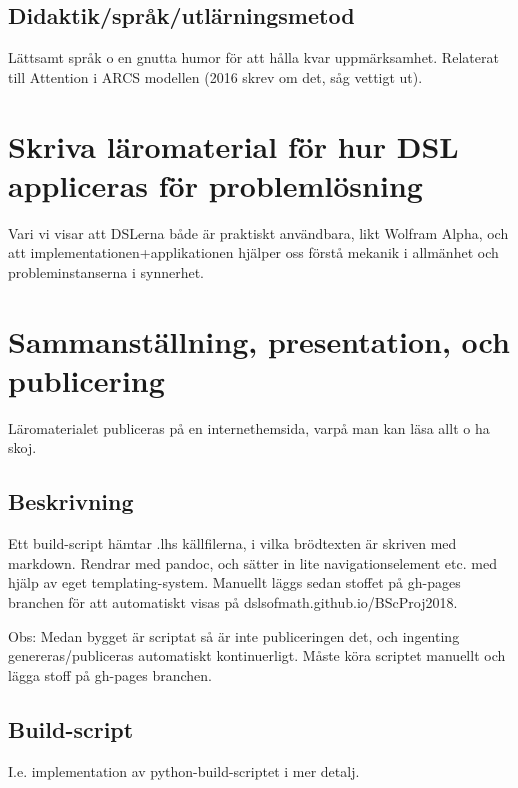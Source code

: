 \begin{binge}
\subsection{Didaktik/språk/utlärningsmetod}

Lättsamt språk o en gnutta humor för att hålla kvar
uppmärksamhet. Relaterat till Attention i ARCS modellen (2016 skrev om
det, såg vettigt ut).

\section{Skriva läromaterial för hur DSL appliceras för problemlösning}

Vari vi visar att DSLerna både är praktiskt användbara, likt Wolfram
Alpha, och att implementationen+applikationen hjälper oss förstå
mekanik i allmänhet och probleminstanserna i synnerhet.


\section{Sammanställning, presentation, och publicering}

Läromaterialet publiceras på en internethemsida, varpå man kan läsa
allt o ha skoj.

\subsection{Beskrivning}

Ett build-script hämtar .lhs källfilerna, i vilka brödtexten är
skriven med markdown. Rendrar med pandoc, och sätter in lite
navigationselement etc. med hjälp av eget templating-system. Manuellt
läggs sedan stoffet på gh-pages branchen för att automatiskt visas på
dslsofmath.github.io/BScProj2018.

Obs: Medan bygget är scriptat så är inte publiceringen det, och
ingenting genereras/publiceras automatiskt kontinuerligt. Måste köra
scriptet manuellt och lägga stoff på gh-pages branchen.

\subsection{Build-script}

I.e. implementation av python-build-scriptet i mer detalj.


\end{binge}
